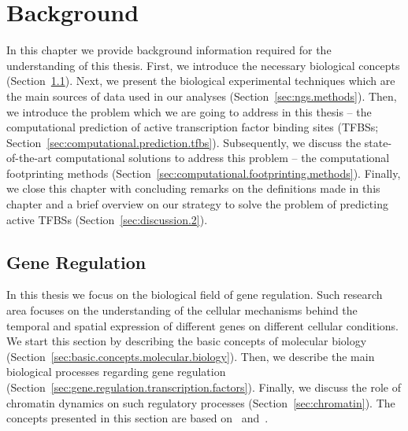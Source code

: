 \chapter{Background}
\label{cha:background}

\graphicspath{{chapter2/figs/}}

In this chapter we provide background information required for the understanding of this thesis. First, we introduce the necessary biological concepts (Section~\ref{sec:gene.regulation}). Next, we present the biological experimental techniques which are the main sources of data used in our analyses (Section~\ref{sec:ngs.methods}). Then, we introduce the problem which we are going to address in this thesis -- the computational prediction of active transcription factor binding sites (TFBSs; Section~\ref{sec:computational.prediction.tfbs}). Subsequently, we discuss the state-of-the-art computational solutions to address this problem -- the computational footprinting methods (Section~\ref{sec:computational.footprinting.methods}). Finally, we close this chapter with concluding remarks on the definitions made in this chapter and a brief overview on our strategy to solve the problem of predicting active TFBSs (Section~\ref{sec:discussion.2}).

\section{Gene Regulation}
\label{sec:gene.regulation}

In this thesis we focus on the biological field of gene regulation. Such research area focuses on the understanding of the cellular mechanisms behind the temporal and spatial expression of different genes on different cellular conditions. We start this section by describing the basic concepts of molecular biology (Section~\ref{sec:basic.concepts.molecular.biology}). Then, we describe the main biological processes regarding gene regulation (Section~\ref{sec:gene.regulation.transcription.factors}). Finally, we discuss the role of chromatin dynamics on such regulatory processes (Section~\ref{sec:chromatin}). The concepts presented in this section are based on~\cite{alberts2007} and~\cite{lodish2007}.

